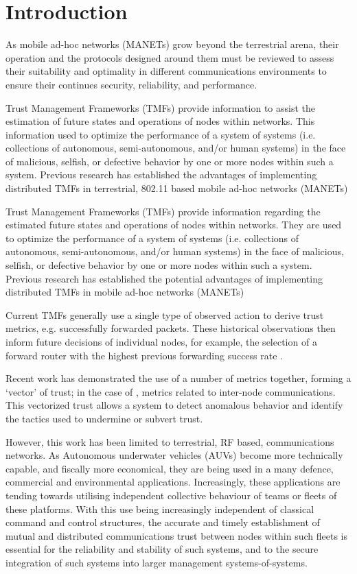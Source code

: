 \documentclass[runningheads,a4paper]{llncs}
\begin{document}
\section{Introduction}\label{sec:introduction}

As mobile ad-hoc networks (MANETs) grow beyond the terrestrial arena, their operation and the protocols designed around them must be reviewed to assess their suitability and optimality in different communications environments to ensure their continues security, reliability, and performance.

Trust Management Frameworks (TMFs) provide information to assist the estimation of future states and operations of nodes within networks. 
This information used to optimize the performance of a system of systems (i.e. collections of autonomous, semi-autonomous, and/or human systems) in the face of malicious, selfish, or defective behavior by one or more nodes within such a system. 
Previous research has established the advantages of implementing distributed TMFs in terrestrial, 802.11 based mobile ad-hoc networks (MANETs) \cite{Guo11}

Trust Management Frameworks (TMFs) provide information regarding the estimated future states and operations of nodes within networks. They are used to optimize the performance of a system of systems (i.e. collections of autonomous, semi-autonomous, and/or human systems) in the face of malicious, selfish, or defective behavior by one or more nodes within such a system. Previous research has established the potential advantages of implementing distributed TMFs in mobile ad-hoc networks (MANETs) \cite{Li2007}

Current TMFs generally use a single type of observed action to derive trust metrics, e.g. successfully forwarded packets. These historical observations then inform future decisions of individual nodes, for example, the selection of a forward router with the highest previous forwarding success rate \cite{Li2008}.

Recent work has demonstrated the use of a number of metrics together, forming a ‘vector’ of trust; in the case of \cite{Guo2012}, metrics related to inter-node communications. This vectorized trust allows a system to detect anomalous behavior and identify the tactics used to undermine or subvert trust.

However, this work has been limited to terrestrial, RF based, communications networks.
As Autonomous underwater vehicles (AUVs) become more technically capable, and fiscally more economical, they are being used in a many defence, commercial and environmental applications. 
Increasingly, these applications are tending towards utilising  independent collective behaviour of teams or fleets of these platforms. 
With this use being increasingly independent of classical command and control structures, the accurate and timely establishment of mutual and distributed communications trust between nodes within such fleets is essential for the reliability and stability of such systems, and to the secure integration of such systems into larger management systems-of-systems. 
\end{document}
